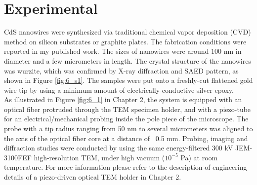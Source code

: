 \section{Experimental}
CdS nanowires were synthesized via traditional chemical vapor deposition (CVD) method on silicon substrates or graphite plates. The fabrication conditions were reported in my published work.\cite{Zhang2015} 
The sizes of nanowires were around 100 nm in diameter and a few micrometers in length. 
The crystal structure of the nanowires was wurzite, which was confirmed by X-ray diffraction and SAED pattern, as shown in Figure \ref{fig:6_s1}. 
The samples were put onto a freshly-cut flattened gold wire tip by using a minimum amount of electrically-conductive silver epoxy. \\

As illustrated in Figure \ref{fig:6_1} in Chapter 2, the system is equipped with an optical fiber protruded through the TEM specimen holder, and with a piezo-tube for an electrical/mechanical probing inside the pole piece of the microscope. 
The probe with a tip radius ranging from 50 nm to several micrometers was aligned to the axis of the optical fiber core at a distance of ~0.5 mm. 
Probing, imaging and diffraction studies were conducted by using the same energy-filtered 300 kV JEM-3100FEF high-resolution TEM, under high vacuum ($10^{-5}$ Pa) at room temperature. 
For more information please refer to the description of engineering details of a piezo-driven optical TEM holder in Chapter 2.\\

